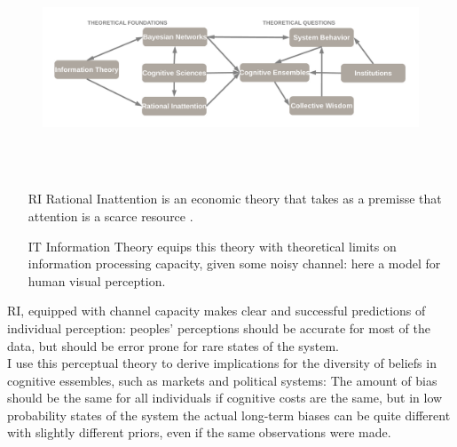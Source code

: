\documentclass{beamer}
\begin{document}
\begin{frame}
\\
\begin{figure}
  \includegraphics[width=\textwidth]{FoundationsQuestions.pdf}
\end{figure}%
\\
\\
\end{frame}
\begin{frame}
\begin{itemize}
\item[RI] Rational Inattention is an economic theory that takes as a premisse that attention is a scarce resource \citep{Woodford12}.

\item[IT] Information Theory \citep{CoverThomas} equips this theory with theoretical limits on information processing capacity, given some noisy channel: here a model for human visual perception.
\end{itemize}       

RI, equipped with channel capacity makes clear and successful predictions of individual perception: peoples' perceptions should be accurate for most of the data, but should be error prone for rare states of the system.
\\

I use this perceptual theory to derive implications for the diversity of beliefs in cognitive essembles, such as markets and political systems: The amount of bias should be the same for all individuals if cognitive costs are the same, but in low probability states of the system the actual long-term biases can be quite different with slightly different priors, even if the same observations were made. 
\end{frame}     
\end{document}
